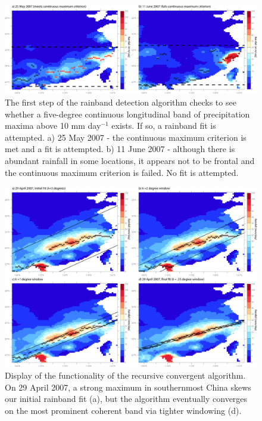 \documentclass[final,grl]{agutexSI}
\begin{document}
 
\begin{figure}

\noindent\includegraphics[width=36pc]{Figures/S1}
\caption{The first step of the rainband detection algorithm checks to see whether a five-degree continuous longitudinal band of precipitation maxima above 10 mm day$^{-1}$ exists. If so, a rainband fit is attempted. a) 25 May 2007 - the continuous maximum criterion is met and a fit is attempted. b) 11 June 2007 - although there is abundant rainfall in some locations, it appears not to be frontal and the continuous maximum criterion is failed. No fit is attempted.}
\end{figure}

\begin{figure}

\noindent\includegraphics[width=36pc]{Figures/S2}
\caption{Display of the functionality of the recursive convergent algorithm. On 29 April 2007, a strong maximum in southernmost China skews our initial rainband fit (a), but the algorithm eventually converges on the most prominent coherent band via tighter windowing (d).}
\end{figure}
\end{document}
